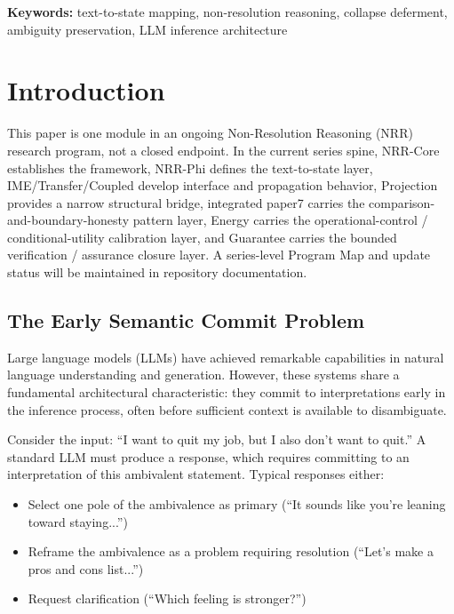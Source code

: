 \documentclass[11pt,a4paper]{article}
\begin{document}
\noindent\textbf{Keywords:} text-to-state mapping, non-resolution reasoning, collapse deferment, 
ambiguity preservation, LLM inference architecture

\section{Introduction}
\label{sec:intro}

This paper is one module in an ongoing Non-Resolution Reasoning (NRR) research program, not a closed endpoint. In the current series spine, NRR-Core establishes the framework, NRR-Phi defines the text-to-state layer, IME/Transfer/Coupled develop interface and propagation behavior, Projection provides a narrow structural bridge, integrated paper7 carries the comparison-and-boundary-honesty pattern layer, Energy carries the operational-control / conditional-utility calibration layer, and Guarantee carries the bounded verification / assurance closure layer. A series-level Program Map and update status will be maintained in repository documentation.

\subsection{The Early Semantic Commit Problem}

Large language models (LLMs) have achieved remarkable capabilities in natural language 
understanding and generation. However, these systems share a fundamental architectural 
characteristic: they commit to interpretations early in the inference process, often 
before sufficient context is available to disambiguate.

Consider the input: ``I want to quit my job, but I also don't want to quit.'' 
A standard LLM must produce a response, which requires committing to an interpretation 
of this ambivalent statement. Typical responses either:
\begin{itemize}
    \item Select one pole of the ambivalence as primary (``It sounds like you're leaning toward staying...'')
    \item Reframe the ambivalence as a problem requiring resolution (``Let's make a pros and cons list...'')
    \item Request clarification (``Which feeling is stronger?'')
\end{itemize}
\end{document}
